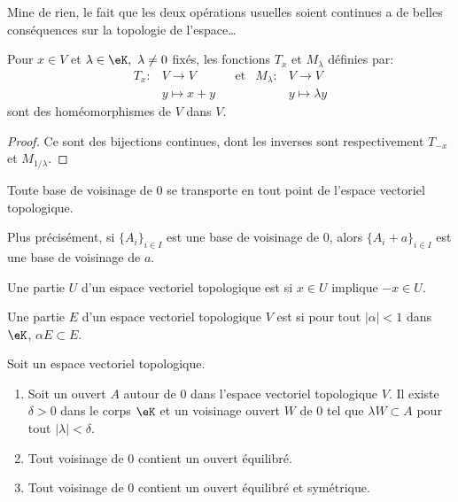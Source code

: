 Mine de rien, le fait que les deux opérations usuelles soient continues a de belles conséquences sur la topologie de l'espace\dots

\begin{proposition}
  Pour \(x \in V \) et \(\lambda \in \eK, \ \lambda \neq 0 \) fixés, les fonctions \( T_x \) et \( M_\lambda \) définies par:
  \begin{align}
    T_x:&V \to V & &\text{et}&M_\lambda:&V \to V\\
    & y \mapsto x+y & & & &y \mapsto \lambda y
  \end{align}
sont des homéomorphismes de \(V \) dans \(V \).
\end{proposition}

\begin{proof}
  Ce sont des bijections continues, dont les inverses sont respectivement \( T_{-x} \) et \( M_{1/\lambda} \).
\end{proof}

\begin{corollary}\label{PropInvarianceTopologie}
  Toute base de voisinage de \( 0 \) se transporte en tout point de l'espace vectoriel topologique.

  Plus précisément, si \( \{ A_i \}_{i\in I}\) est une base de voisinage de \( 0\), alors \( \{ A_i+a \}_{i\in I}\) est une base de voisinage de \( a\).
\end{corollary}

\begin{definition}
    Une partie \( U\) d'un espace vectoriel topologique est  si \( x\in U\) implique \( -x\in U\).
\end{definition}

\begin{definition}
    Une partie \( E\) d'un espace vectoriel topologique \( V\) est  si pour tout \( | \alpha |<1\) dans \( \eK\), \( \alpha E\subset E\).
\end{definition}

\begin{lemma}     \label{LEMooYSWXooNqAcOQ}
    Soit un espace vectoriel topologique.
    \begin{enumerate}
        \item       \label{ITEMooSWWQooTreWIE}
            Soit un ouvert \( A\) autour de \( 0\) dans l'espace vectoriel topologique \( V\). Il existe \( \delta>0\) dans le corps \( \eK\) et un voisinage ouvert \(W\) de \( 0\) tel que \( \lambda W\subset A\) pour tout \( | \lambda |<\delta\).
        \item       \label{ITEMooXZNHooGVplpu}
            Tout voisinage de \( 0\) contient un ouvert équilibré.
        \item       \label{ITEMooRLVSooGihcLc}
            Tout voisinage de \( 0\) contient un ouvert équilibré et symétrique.
    \end{enumerate}
\end{lemma}

